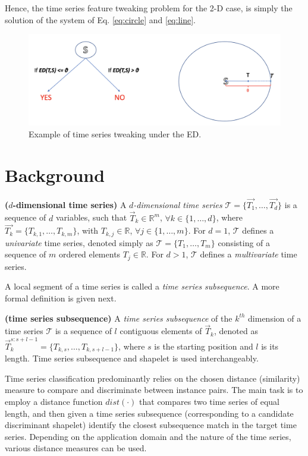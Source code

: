 \documentclass[smallextended,natbib]{svjour3}
\begin{document}
Hence, the time series feature tweaking problem for the 2-D case, is simply the solution of the system of Eq. \ref{eq:circle} and \ref{eq:line}.  

\begin{figure}[h]
\centering
\includegraphics[scale=0.2]{exampleED.png}%
\caption{Example of time series tweaking under the ED.}\label{fig:exampleED}
\end{figure}

\section{Background}
\begin{definition} \textbf{($d$-dimensional time series)} %
A \emph{$d$-dimensional time series} $\mathcal{T} = \{\vec{T_{1}}, \ldots, \vec{T_{d}}\}$ is a sequence of $d$ variables, such that $\vec{T}_k\in \mathbb{R}^m$, $\forall k\in\{1,\dots,d\}$, where $\vec{T_k}=\{T_{k,1},\ldots,T_{k,m}\}$, with $T_{k,j}\in \mathbb{R}$, $\forall j\in\{1,\dots,m\}$. For $d=1$, $\mathcal{T}$ defines a \emph{univariate} time series, denoted simply as $\mathcal{T}=\{T_1,\ldots,T_m\}$ consisting of a sequence of $m$ ordered elements $T_j \in \mathbb{R}$. For $d>1$, $\mathcal{T}$ defines a \emph{multivariate} time series.
\end{definition}

A local segment of a time series is called a \emph{time series subsequence}. A more formal definition is given next.

\begin{definition} \textbf{(time series subsequence)} 
 A \emph{time series sub\-sequence} of the $k^{th}$ dimension of a time series $\mathcal{T}$ is a sequence of $l$ contiguous elements of $\vec{T}_k$, denoted as $\vec{T}_{k}^{s:s+l-1} = \{T_{k,s}, \ldots, T_{k,s+l-1}\}$, where $s$ is the starting position and $l$ is its length. Time series sub\-sequence and shapelet is used interchangeably.
\end{definition}

Time series classification predominantly relies on the chosen distance (similarity) measure to compare and discriminate between instance pairs. The main task is to employ a distance function $dist(\cdot)$ that compares two time series of equal length, and then given a time series subsequence (corresponding to a candidate discriminant shapelet) identify the closest subsequence match in the target time series. Depending on the application domain and the nature of the time series, various distance measures can be used.
\end{document}
